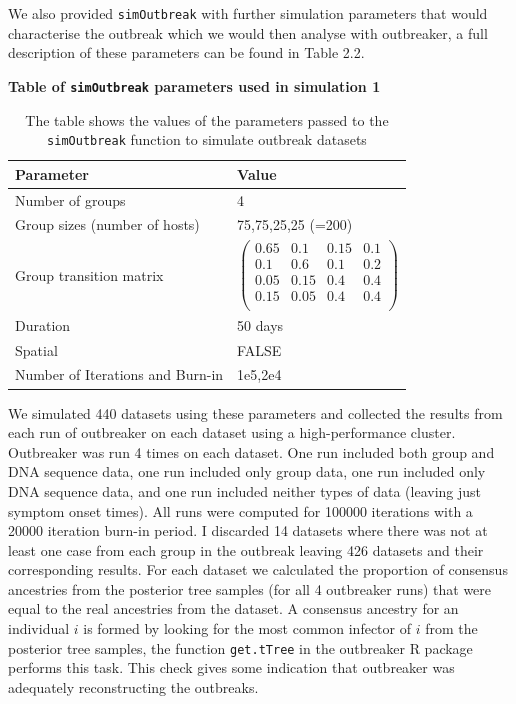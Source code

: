\documentclass[11pt,a4paper]{report}
\begin{document}
We also provided {\tt simOutbreak} with further simulation parameters that would characterise the outbreak which we would then analyse with outbreaker, a full description of these parameters can be found in Table 2.2.
\begin{table}[h!]
\centering
{\bf Table of {\tt simOutbreak} parameters used in simulation 1}
\caption{The table shows the values of the parameters passed to the {\tt simOutbreak} function to simulate outbreak datasets}
\begin{tabular}{|l|l|}
\hline
Parameter & Value \\
\hline
Number of groups & 4 \\
\hline
Group sizes (number of hosts) & 75,75,25,25 (=200) \\
\hline
Group transition matrix &  
$
\begin{pmatrix}
	0.65 & 0.1 & 0.15 & 0.1 \\
	0.1 & 0.6 & 0.1 & 0.2 \\
	0.05 & 0.15 & 0.4 & 0.4 \\
	0.15 & 0.05 & 0.4 & 0.4 \\
\end{pmatrix}
$ \\
\hline
Duration & 50 days \\
\hline
Spatial & FALSE \\
\hline
Number of Iterations and Burn-in & 1e5,2e4 \\
\hline
\end{tabular}
\end{table}

We simulated 440 datasets using these parameters and collected the results from each run of outbreaker on each dataset using a high-performance cluster. Outbreaker was run 4 times on each dataset. One run included both group and DNA sequence data, one run included only group data, one run included only DNA sequence data, and one run included neither types of data (leaving just symptom onset times). All runs were computed for 100000 iterations with a 20000 iteration burn-in period. I discarded 14 datasets where there was not at least one case from each group in the outbreak leaving 426 datasets and their corresponding results. For each dataset we calculated the proportion of consensus ancestries from the posterior tree samples (for all 4 outbreaker runs) that were equal to the real ancestries from the dataset. A consensus ancestry for an individual $i$ is formed by looking for the most common infector of $i$ from the posterior tree samples, the function {\tt get.tTree} in the outbreaker R package performs this task. This check gives some indication that outbreaker was adequately reconstructing the outbreaks.
\end{document}
